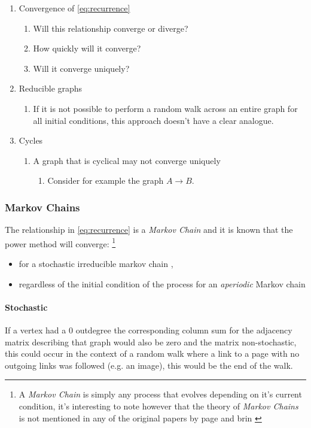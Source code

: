 \documentclass[11pt]{article}
\begin{document}
\begin{enumerate}
\item Convergence of \eqref{eq:recurrence}
\begin{enumerate}
\item Will this relationship converge or diverge?
\item How quickly will it converge?
\item Will it converge uniquely?
\end{enumerate}
\item Reducible graphs
\begin{enumerate}
\item If it is not possible to perform a random walk across an entire graph for all initial conditions, this approach doesn't have a clear analogue.
\end{enumerate}
\item Cycles
\begin{enumerate}
\item A graph that is cyclical may not converge uniquely
\begin{enumerate}
\item Consider for example the graph \(A\rightarrow B\).
\end{enumerate}
\end{enumerate}
\end{enumerate}

\subsubsection{Markov Chains}
\label{markov}
The relationship in \eqref{eq:recurrence} is a \emph{Markov Chain}  and it is known
that the power method will converge: \footnote{A \emph{Markov Chain} is
simply any process that evolves depending on it's current condition, it's
interesting to note however that the theory of \emph{Markov Chains} is not mentioned in any
of the original papers by page and brin
\cite[]{langvilleGooglePageRankScience2012}}

\begin{itemize}
\item for a stochastic irreducible markov chain \cite[.5]{larsonElementaryLinearAlgebra1991},
\item regardless of the initial condition of the process for an \emph{aperiodic} Markov chain \cite[]{langvilleGooglePageRankScience2012}
\end{itemize}

\paragraph{Stochastic}
\label{stochastic}
If a vertex had a 0 outdegree the corresponding column sum for the adjacency
matrix describing that graph would also be zero and the matrix non-stochastic,
this could occur in the context of a random walk where a link to a page with no
outgoing links was followed (e.g. an image), this would be the end of the
walk.
\end{document}
